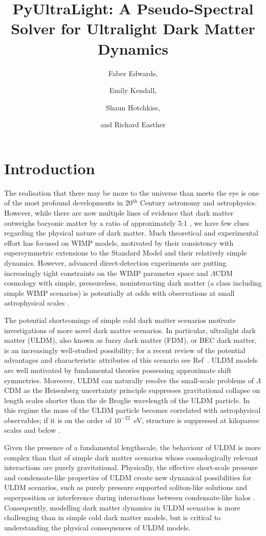 \documentclass[a4paper,11pt]{article}
\title{ PyUltraLight: A Pseudo-Spectral Solver for Ultralight Dark Matter Dynamics}
\author[]{Faber Edwards,}
\author[]{Emily Kendall,}
\author[]{Shaun Hotchkiss,}
\author[]{and Richard Easther}
\affiliation[]{Department of Physics, University of Auckland, Private Bag 92019, Auckland, New Zealand}
\newcommand{\re}[1]{\textcolor{blue}{[{\bf RE}: #1]}}
\begin{document}
\maketitle
\flushbottom

\section{Introduction}
\label{sec:intro}

The realisation that there may be more to the universe than meets the eye is one of the most profound developments in 20$^{\textrm{th}}$ Century astronomy and astrophysics. However, while there are now multiple lines of evidence that dark matter outweighs baryonic matter by a ratio of approximately 5:1 \cite{Planck2015}, we have few clues regarding the physical nature of dark matter.  Much theoretical and experimental effort has focused on  WIMP models, motivated by their consistency with supersymmetric extensions to the Standard Model and their relatively simple dynamics. However, advanced direct-detection experiments are putting increasingly tight constraints on the WIMP parameter space \cite{Tan2016, Akerib2017} and $\Lambda$CDM cosmology with simple, pressureless, noninteracting dark matter (a class including simple WIMP scenarios) is potentially at odds with observations at small astrophysical scales \cite{Bull2016}.  

The potential shortcomings of simple cold dark matter scenarios motivate investigations of more novel dark matter scenarios. In particular, ultralight dark matter (ULDM), also known as fuzzy dark matter (FDM), or BEC dark matter, is an increasingly well-studied possibility; for a recent review of the potential advantages and characteristic attributes of this scenario see Ref~\cite{Hui2016}.   ULDM models are well motivated by fundamental theories possessing approximate shift symmetries. Moreover, ULDM can naturally resolve the small-scale problems of $\Lambda$CDM as the Heisenberg uncertainty principle suppresses gravitational collapse on length scales shorter than the de Broglie wavelength of the ULDM particle. In this regime the mass of the ULDM particle becomes correlated with astrophysical observables; if it is on the order of $10^{-22}$~eV, structure is suppressed at kiloparsec scales and below \cite{Hu2000}. 

Given the presence of a fundamental  lengthscale, the behaviour of ULDM is more complex than that of simple dark matter scenarios whose cosmologically relevant interactions are purely gravitational. Physically, the effective short-scale pressure and  condensate-like properties of ULDM  create new dynamical possibilities for ULDM scenarios, such as  purely pressure supported soliton-like solutions  \cite{Marsh2015} and superposition or interference during interactions between condensate-like halos \cite{Schwabe2016}. Consequently, modelling dark matter dynamics in ULDM scenarios is more challenging than in simple cold dark matter models, but is critical to understanding the physical consequences of ULDM models. 
\end{document}
